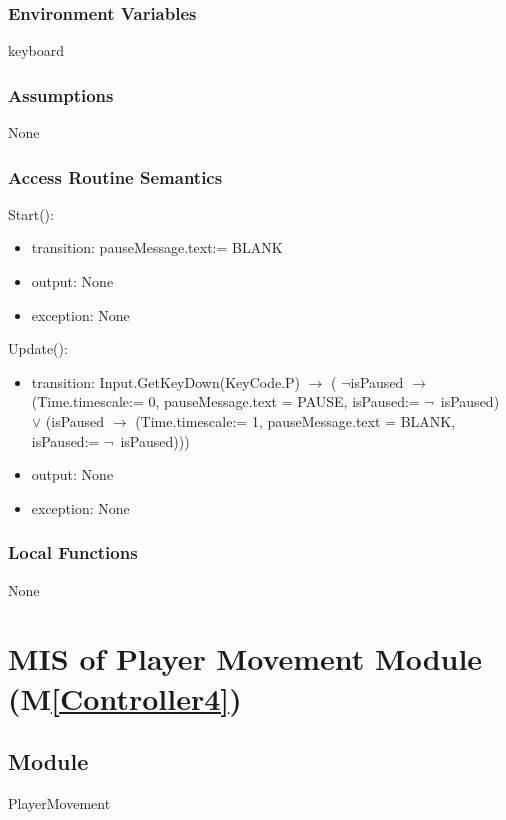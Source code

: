\documentclass[12pt, titlepage]{article}
\newcommand{\mref}[1]{M\ref{#1}}
\begin{document}
\subsubsection{Environment Variables}

keyboard

\subsubsection{Assumptions}

None

\subsubsection{Access Routine Semantics}

\noindent Start():
\begin{itemize}
\item transition: pauseMessage.text:= BLANK
\item output: None 
\item exception: None
\end{itemize}
\noindent Update():
\begin{itemize}
\item transition: Input.GetKeyDown(KeyCode.P) $\rightarrow$ (	$\neg$isPaused $\rightarrow$ (Time.timescale:= 0, pauseMessage.text = PAUSE, isPaused:= $\neg$~isPaused) $\lor$ (isPaused $\rightarrow$  (Time.timescale:= 1, pauseMessage.text = BLANK, isPaused:= $\neg$~isPaused)))
\item output: None 
\item exception: None
\end{itemize}

\subsubsection{Local Functions}
None


 \newpage

\section{MIS of Player Movement Module (\mref{Controller4})}

\subsection{Module}
PlayerMovement
\end{document}

